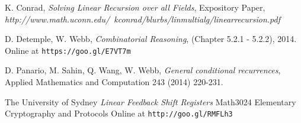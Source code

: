 \documentclass[a4paper]{article}
\theoremstyle{definition}
\begin{document}
\begin{thebibliography}{9}

  K. Conrad,
  \emph{Solving Linear Recursion over all Fields},
  Expository Paper, \textit{http://www.math.uconn.edu/~kconrad/blurbs/linmultialg/linearrecursion.pdf}

  D. Detemple, W. Webb,
  \emph{Combinatorial Reasoning},
  (Chapter 5.2.1 - 5.2.2), 
  2014. Online at \texttt{https://goo.gl/E7VT7m} %
  
  D. Panario, M. Sahin, Q. Wang, W. Webb,
  \emph{General conditional recurrences},
  Applied Mathematics and Computation 243
  (2014) 220-231.

  The University of Sydney
  \emph{Linear Feedback Shift Registers}
  Math3024 Elementary Cryptography and Protocols
  Online at \texttt{http://goo.gl/RMFLh3}

\end{thebibliography}
\end{document}
